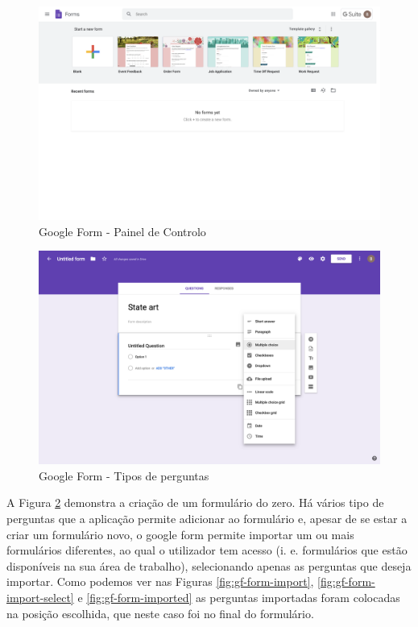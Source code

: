 \begin{figure}[ht!]
	\begin{center}
		\includegraphics[width=1\textwidth]{img/gf/gf-dashboard}
		\caption{Google Form - Painel de Controlo}
		\label{fig:gf-dashboard}
	\end{center}
\end{figure}


\begin{figure}[ht!]
	\begin{center}
		\includegraphics[width=1\textwidth]{img/gf/gf-form-q-type}
		\caption{Google Form - Tipos de perguntas}
		\label{fig:gf-form-q-type}
	\end{center}
\end{figure}

A Figura \ref{fig:gf-form-q-type} demonstra a criação de um formulário do zero. Há vários tipo de perguntas que a aplicação permite adicionar ao formulário e, apesar de se estar a criar um formulário novo, o google form permite importar um ou mais formulários diferentes, ao qual o utilizador tem acesso (i. e. formulários que estão disponíveis na sua área de trabalho), selecionando apenas as perguntas que deseja importar. Como podemos ver nas Figuras \ref{fig:gf-form-import}, \ref{fig:gf-form-import-select} e \ref{fig:gf-form-imported} as perguntas importadas foram colocadas na posição escolhida, que neste caso foi no final do formulário.

